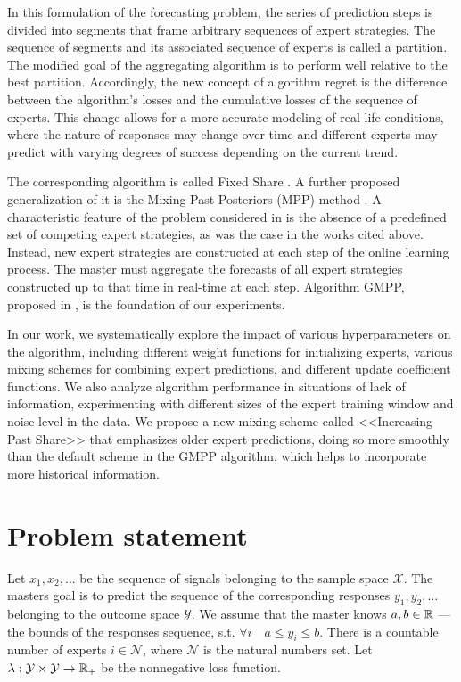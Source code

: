 \documentclass[12pt, twoside]{article}
\begin{document}
In this formulation of the forecasting problem, the series of prediction steps is divided into segments that frame arbitrary sequences of expert strategies. 
The sequence of segments and its associated sequence of experts is called a partition. 
The modified goal of the aggregating algorithm is to perform well relative to the best partition. 
Accordingly, the new concept of algorithm regret is the difference between the algorithm's losses and the cumulative losses of the sequence of experts. 
This change allows for a more accurate modeling of real-life conditions, where the nature of responses may change over time and different experts may predict with varying degrees of success depending on the current trend. 

The corresponding algorithm is called Fixed Share \cite{article98}. 
A further proposed generalization of it is the Mixing Past Posteriors (MPP) method \cite{article02}. 
A characteristic feature of the problem considered in \cite{article} is the absence of a predefined set of competing expert strategies, as was the case in the works cited above.
Instead, new expert strategies are constructed at each step of the online learning process.
The master must aggregate the forecasts of all expert strategies constructed up to that time in real-time at each step. 
Algorithm GMPP, proposed in \cite{article}, is the foundation of our experiments. 

In our work, we systematically explore the impact of various hyperparameters on the algorithm, including different weight functions for initializing experts, 
various mixing schemes for combining expert predictions, and different update coefficient functions. 
We also analyze algorithm performance in situations of lack of information,  experimenting with different sizes of the expert training window and noise level in the data. 
We propose a new mixing scheme called <<Increasing Past Share>> that emphasizes older expert predictions, 
doing so more smoothly than the default scheme in the GMPP algorithm, which helps to incorporate more historical information.

\section{Problem statement}

Let $x_1, x_2, \dots$ be the sequence of signals belonging to the sample space  $\mathcal{X}$. 
The masters goal is to predict the sequence of the corresponding responses $y_1, y_2, \dots$ belonging to the outcome space $\mathcal{Y}$. 
We assume that the master knows $a, b \in \mathbb{R}$ --- the bounds of the responses sequence, s.t. $\forall i\quad a \leq y_i \leq b$.
There is a countable number of experts $i \in \mathcal{N}$, where $\mathcal{N}$ is the natural numbers set. 
Let $ \lambda: \mathcal{Y} \times \mathcal{Y} \rightarrow \RR_+$ be the nonnegative loss function. 
\end{document}
